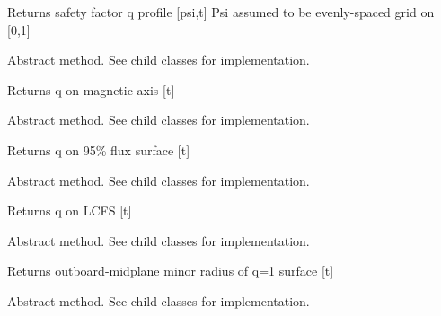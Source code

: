 \documentclass[letterpaper,10pt,english]{sphinxmanual}
\begin{document}
\begin{fulllineitems}
\begin{fulllineitems}
Returns safety factor q profile {[}psi,t{]}
Psi assumed to be evenly-spaced grid on {[}0,1{]}

\end{fulllineitems}


\begin{fulllineitems}
\label{eqtools:eqtools.core.Equilibrium.getQ0}
Abstract method.  See child classes for implementation.

Returns q on magnetic axis {[}t{]}

\end{fulllineitems}


\begin{fulllineitems}
\label{eqtools:eqtools.core.Equilibrium.getQ95}
Abstract method.  See child classes for implementation.

Returns q on 95\% flux surface {[}t{]}

\end{fulllineitems}


\begin{fulllineitems}
\label{eqtools:eqtools.core.Equilibrium.getQLCFS}
Abstract method.  See child classes for implementation.

Returns q on LCFS {[}t{]}

\end{fulllineitems}


\begin{fulllineitems}
\label{eqtools:eqtools.core.Equilibrium.getQ1Surf}
Abstract method.  See child classes for implementation.

Returns outboard-midplane minor radius of q=1 surface {[}t{]}

\end{fulllineitems}


\begin{fulllineitems}
\label{eqtools:eqtools.core.Equilibrium.getQ2Surf}
Abstract method.  See child classes for implementation.


\end{fulllineitems}
\end{fulllineitems}
\end{document}
